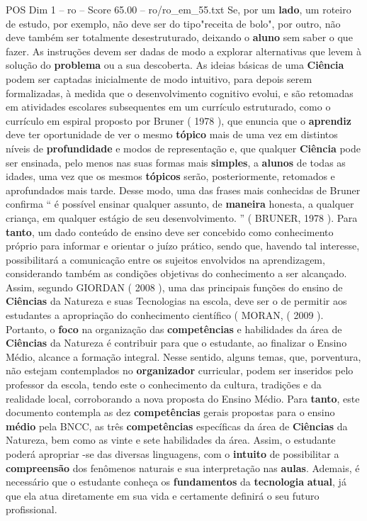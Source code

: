\begin{textsample}{POS Dim 1 – ro – Score 65.00 – ro/ro\_em\_55.txt}
Se, por um \textbf{lado}, um roteiro de estudo, por exemplo, não deve ser do tipo"receita de bolo", por outro, não deve também ser totalmente desestruturado, deixando o \textbf{aluno} sem saber o que fazer.
As instruções devem ser dadas de modo a explorar alternativas que levem à solução do \textbf{problema} ou a sua descoberta.
As ideias básicas de uma \textbf{Ciência} podem ser captadas inicialmente de modo intuitivo, para depois serem formalizadas, à medida que o desenvolvimento cognitivo evolui, e são retomadas em atividades escolares subsequentes em um currículo estruturado, como o currículo em espiral proposto por Bruner ( 1978 ), que enuncia que o \textbf{aprendiz} deve ter oportunidade de ver o mesmo \textbf{tópico} mais de uma vez em distintos níveis de \textbf{profundidade} e modos de representação e, que qualquer \textbf{Ciência} pode ser ensinada, pelo menos nas suas formas mais \textbf{simples}, a \textbf{alunos} de todas as idades, uma vez que os mesmos \textbf{tópicos} serão, posteriormente, retomados e aprofundados mais tarde.
Desse modo, uma das frases mais conhecidas de Bruner confirma “ é possível ensinar qualquer assunto, de \textbf{maneira} honesta, a qualquer criança, em qualquer estágio de seu desenvolvimento. ” ( BRUNER, 1978 ).
Para \textbf{tanto}, um dado conteúdo de ensino deve ser concebido como conhecimento próprio para informar e orientar o juízo prático, sendo que, havendo tal interesse, possibilitará a comunicação entre os sujeitos envolvidos na aprendizagem, considerando também as condições objetivas do conhecimento a ser alcançado.
Assim, segundo GIORDAN ( 2008 ), uma das principais funções do ensino de \textbf{Ciências} da Natureza e suas Tecnologias na escola, deve ser o de permitir aos estudantes a apropriação do conhecimento científico ( MORAN, ( 2009 ).
Portanto, o \textbf{foco} na organização das \textbf{competências} e habilidades da área de \textbf{Ciências} da Natureza é contribuir para que o estudante, ao finalizar o Ensino Médio, alcance a formação integral.
Nesse sentido, alguns temas, que, porventura, não estejam contemplados no \textbf{organizador} curricular, podem ser inseridos pelo professor da escola, tendo este o conhecimento da cultura, tradições e da realidade local, corroborando a nova proposta do Ensino Médio.
Para \textbf{tanto}, este documento contempla as dez \textbf{competências} gerais propostas para o ensino \textbf{médio} pela BNCC, as três \textbf{competências} específicas da área de \textbf{Ciências} da Natureza, bem como as vinte e sete habilidades da área.
Assim, o estudante poderá apropriar -se das diversas linguagens, com o \textbf{intuito} de possibilitar a \textbf{compreensão} dos fenômenos naturais e sua interpretação nas \textbf{aulas}.
Ademais, é necessário que o estudante conheça os \textbf{fundamentos} da \textbf{tecnologia} \textbf{atual}, já que ela atua diretamente em sua vida e certamente definirá o seu futuro profissional.


\end{textsample}
